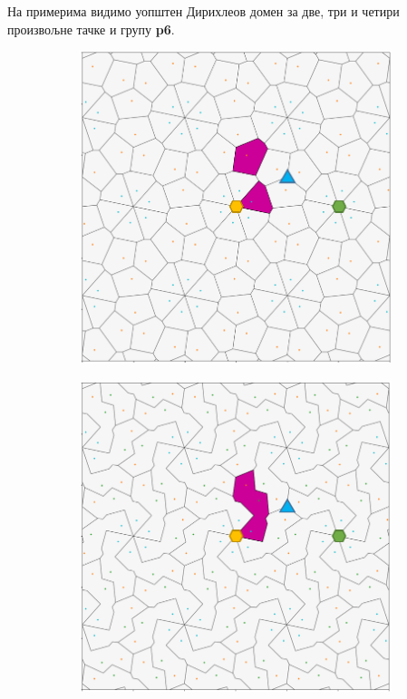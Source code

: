 \documentclass[12pt]{article}
\begin{document}


\begin{samepage}
На примерима видимо уопштен Дирихлеов домен за две, три и четири произвољне тачке и групу \textbf{p6}.

\begin{figure}[H]
  \begin{subfigure}[b]{0.32\textwidth}
    \includegraphics[width=.9\textwidth]{dirh_2_tacke.png}
    \label{fig:f4}
  \end{subfigure}
  \begin{subfigure}[b]{0.32\textwidth}
    \includegraphics[width=.9\textwidth]{dirh_3_tacke.png}

\end{subfigure}
\end{figure}
\end{samepage}
\end{document}
